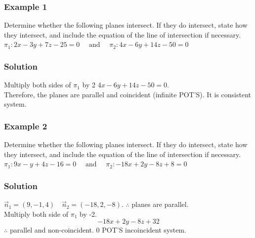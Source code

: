 \documentclass{article}
\begin{document}
\subsubsection*{Example 1}
Determine whether the following planes intersect. If they do intersect, state how they intersect, and include the equation of the line of intersection if necessary.
$\pi_1: 2x-3y+7z-25=0 \quad \text{ and } \quad \pi_2:4x-6y+14z-50=0$
\subsubsection*{Solution}
Multiply both sides of $\pi_1$ by 2 $4x-6y+14z-50=0$. \\
Therefore, the planes are parallel and coincident (infinite POT'S). It is consistent  system.

\subsubsection*{Example 2}
Determine whether the following planes intersect. If they do intersect, state how they intersect, and include the equation of the line of intersection if necessary.
$\pi_1: 9x-y+4z-16=0 \quad \text{ and } \quad \pi_2:-18x+2y-8z+8=0$
\subsubsection*{Solution}
$\vec{n}_1=(9,-1,4) \quad \vec{n}_2=(-18,2,-8)$. $\therefore $ planes are parallel.\\
Multiply both side of $\pi_1$ by -2.
$$-18x+2y-8z+32$$
$\therefore$ parallel and non-coincident. 0 POT'S incoincident system.
\end{document}
